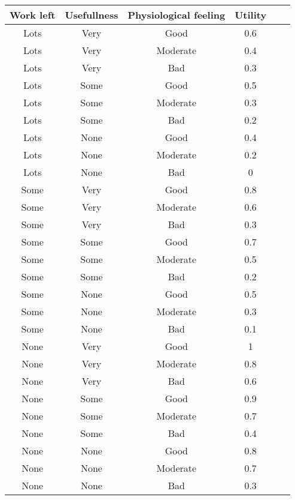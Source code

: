 \begin{tabular}{|c|c|c|c|c|c|}
\hline
Work left   &   Usefullness &   Physiological feeling   &   Utility \\
\hline
Lots    &   Very    &   Good    &   0.6 \\
Lots    &   Very    &   Moderate    &   0.4 \\
Lots    &   Very    &   Bad &   0.3 \\
Lots    &   Some    &   Good    &   0.5 \\
Lots    &   Some    &   Moderate    &   0.3 \\
Lots    &   Some    &   Bad &   0.2 \\
Lots    &   None    &   Good    &   0.4 \\
Lots    &   None    &   Moderate    &   0.2 \\
Lots    &   None    &   Bad &   0 \\
Some    &   Very    &   Good    &   0.8 \\
Some    &   Very    &   Moderate    &   0.6 \\
Some    &   Very    &   Bad &   0.3 \\
Some    &   Some    &   Good    &   0.7 \\
Some    &   Some    &   Moderate    &   0.5 \\
Some    &   Some    &   Bad &   0.2 \\
Some    &   None    &   Good    &   0.5 \\
Some    &   None    &   Moderate    &   0.3 \\
Some    &   None    &   Bad &   0.1 \\
None    &   Very    &   Good    &   1   \\
None    &   Very    &   Moderate    &   0.8 \\
None    &   Very    &   Bad &   0.6 \\
None    &   Some    &   Good    &   0.9 \\
None    &   Some    &   Moderate    &   0.7 \\
None    &   Some    &   Bad &   0.4 \\
None    &   None    &   Good    &   0.8 \\
None    &   None    &   Moderate    &   0.7 \\
None    &   None    &   Bad &   0.3 \\

\hline
\end{tabular}